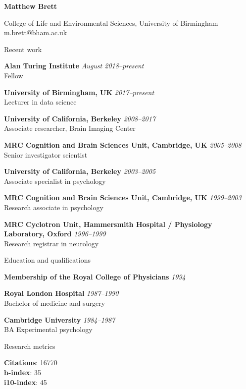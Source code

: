 \documentclass[11pt]{cv}
\newcommand{\PlaceDate}[2]{{\bf #1} \hfill {\em #2} \\}
\newcommand{\PlaceDateNote}[3]{{\bf #1} \hfill {\em #2} \\#3}
\newcommand{\UCB}{University of California, Berkeley}
\newcommand{\UoB}{University of Birmingham, UK}
\newcommand{\CBU}{MRC Cognition and Brain Sciences Unit, Cambridge, UK}
\begin{document}
{\huge \bf Matthew Brett}

College of Life and Environmental Sciences, University of Birmingham \\
m.brett@bham.ac.uk

\begin{cvSection}{Recent work}

\PlaceDateNote{Alan Turing Institute}{August 2018--present}{
    Fellow}

\PlaceDateNote{\UoB}{2017--present }{
    Lecturer in data science}

\PlaceDateNote{\UCB}{2008--2017 }{
    Associate researcher, Brain Imaging Center}

\PlaceDateNote{\CBU}{2005--2008}{
    Senior investigator scientist}

\PlaceDateNote{\UCB}{2003--2005 }{
    Associate specialist in psychology}

\PlaceDateNote{\CBU}{1999--2003 }{
    Research associate in psychology}

\PlaceDateNote{
MRC Cyclotron Unit, Hammersmith Hospital / Physiology Laboratory, Oxford}
{1996--1999}
    {Research registrar in neurology}

\end{cvSection}

\begin{cvSection}{Education and qualifications}

{\bf Membership of the Royal College of Physicians} \hfill {\em 1994}

\PlaceDate{Royal London Hospital}{1987--1990 }
Bachelor of medicine and surgery

\PlaceDateNote{Cambridge University}{1984--1987 }{
BA Experimental psychology}

\end{cvSection}

\begin{cvSection}{Research metrics}

{\bf Citations}: 16770 \\
{\bf h-index}: 35 \\
{\bf i10-index}: 45

\end{cvSection}
\end{document}
